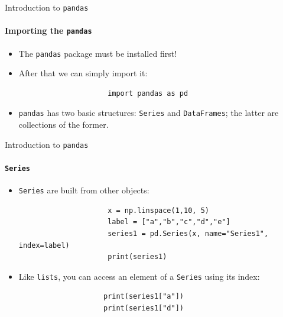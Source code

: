 \documentclass[notes,11pt, aspectratio=169, xcolor=table]{beamer}
\begin{document}
        \begin{frame}[fragile=singleslide]{Introduction to \texttt{pandas}}
        \framesubtitle{Importing the \texttt{pandas}}
            
             \begin{itemize}
    
                \item The \texttt{pandas} package must be installed first!
                
                \item After that we can simply import it:
    
                    \begin{verbatim}
                     import pandas as pd
                    \end{verbatim}
                    
                \item \texttt{pandas} has two basic structures: \texttt{Series} and \texttt{DataFrames}; the latter are collections of the former.
                    
            \end{itemize}             
    
        \end{frame}
        
        \begin{frame}[fragile=singleslide]{Introduction to \texttt{pandas}}
        \framesubtitle{\texttt{Series}}
            
             \begin{itemize}
    
                \item \texttt{Series} are built from other objects:
    
                    \begin{verbatim}
                     x = np.linspace(1,10, 5)
                     label = ["a","b","c","d","e"]
                     series1 = pd.Series(x, name="Series1", index=label)
                     print(series1)
                    \end{verbatim}
                    
                \item Like \texttt{lists}, you can access an element of a \texttt{Series} using its index:
                
                \begin{verbatim}
                    print(series1["a"])
                    print(series1["d"])
                \end{verbatim}
                
                    
            \end{itemize}             
    
        \end{frame}    
\end{document}
